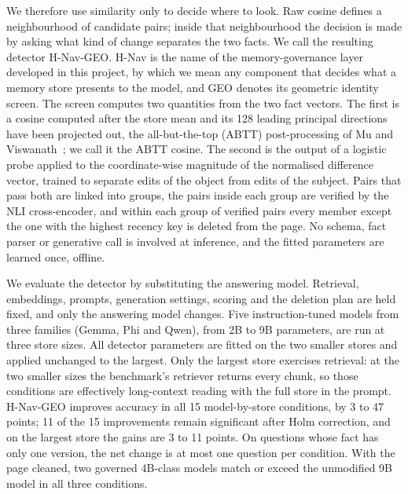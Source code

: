 \documentclass[journal=jcisd8,manuscript=article]{achemso}
\newcommand{\geo}{H-Nav-GEO}
\begin{document}
We therefore use similarity only to decide where to look. Raw cosine defines a neighbourhood of candidate pairs; inside that neighbourhood the decision is made by asking what kind of change separates the two facts. We call the resulting detector \geo{}. H-Nav is the name of the memory-governance layer developed in this project, by which we mean any component that decides what a memory store presents to the model, and GEO denotes its geometric identity screen. The screen computes two quantities from the two fact vectors. The first is a cosine computed after the store mean and its 128 leading principal directions have been projected out, the all-but-the-top (ABTT) post-processing of Mu and Viswanath~\cite{mu2018abtt}; we call it the ABTT cosine. The second is the output of a logistic probe applied to the coordinate-wise magnitude of the normalised difference vector, trained to separate edits of the object from edits of the subject. Pairs that pass both are linked into groups, the pairs inside each group are verified by the NLI cross-encoder, and within each group of verified pairs every member except the one with the highest recency key is deleted from the page. No schema, fact parser or generative call is involved at inference, and the fitted parameters are learned once, offline.

We evaluate the detector by substituting the answering model. Retrieval, embeddings, prompts, generation settings, scoring and the deletion plan are held fixed, and only the answering model changes. Five instruction-tuned models from three families (Gemma, Phi and Qwen), from 2B to 9B parameters, are run at three store sizes. All detector parameters are fitted on the two smaller stores and applied unchanged to the largest. Only the largest store exercises retrieval: at the two smaller sizes the benchmark's retriever returns every chunk, so those conditions are effectively long-context reading with the full store in the prompt. \geo{} improves accuracy in all 15 model-by-store conditions, by 3 to 47 points; 11 of the 15 improvements remain significant after Holm correction, and on the largest store the gains are 3 to 11 points. On questions whose fact has only one version, the net change is at most one question per condition. With the page cleaned, two governed 4B-class models match or exceed the unmodified 9B model in all three conditions.
\end{document}
